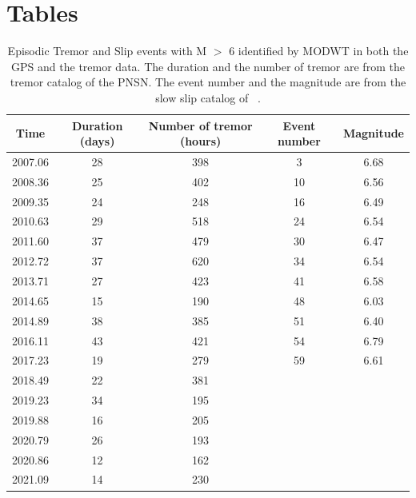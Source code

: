 \documentclass{article}
\begin{document}
\newpage

\section*{Tables}

\begin{table}[hbt!]
\caption{Episodic Tremor and Slip events with M $>$ 6 identified by MODWT in both the GPS and the tremor data. The duration and the number of tremor are from the tremor catalog of the PNSN. The event number and the magnitude are from the slow slip catalog of ~\citet{MIC_2019}.}
 \centering
 \begin{tabular}{c c c c c}
 \hline
 Time & Duration (days) & Number of tremor (hours) & Event number & Magnitude \\
 \hline
 2007.06 & 28 & 398 & 3 & 6.68 \\
 2008.36 & 25 & 402 & 10 & 6.56 \\
 2009.35 & 24 & 248 & 16 & 6.49 \\
 2010.63 & 29 & 518 & 24 & 6.54 \\
 2011.60 & 37 & 479 & 30 & 6.47 \\
 2012.72 & 37 & 620 & 34 & 6.54 \\
 2013.71 & 27 & 423 & 41 & 6.58 \\
 2014.65 & 15 & 190 & 48 & 6.03 \\
 2014.89 & 38 & 385 & 51 & 6.40 \\
 2016.11 & 43 & 421 & 54 & 6.79 \\
 2017.23 & 19 & 279 & 59 & 6.61 \\
 2018.49 & 22 & 381 & & \\
 2019.23 & 34 & 195 & & \\
 2019.88 & 16 & 205 & & \\
 2020.79 & 26 & 193 & & \\
 2020.86 & 12 & 162 & & \\
 2021.09 & 14 & 230 & & \\
 \hline
 \end{tabular}
 \end{table}
\end{document}

